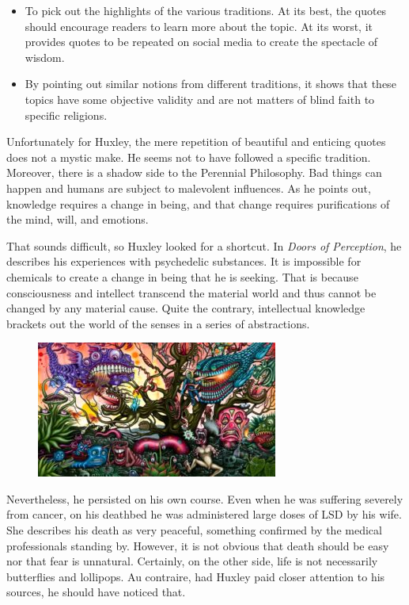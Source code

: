 \begin{itemize}
\item To pick out the highlights of the various traditions. At its best, the quotes should encourage readers to learn more about the topic. At its worst, it provides quotes to be repeated on social media to create the spectacle of wisdom. 
\item By pointing out similar notions from different traditions, it shows that these topics have some objective validity and are not matters of blind faith to specific religions. 
\end{itemize}
Unfortunately for Huxley, the mere repetition of beautiful and enticing quotes does not a mystic make. He seems not to have followed a specific tradition. Moreover, there is a shadow side to the Perennial Philosophy. Bad things can happen and humans are subject to malevolent influences. As he points out, knowledge requires a change in being, and that change requires purifications of the mind, will, and emotions.

That sounds difficult, so Huxley looked for a shortcut. In \emph{Doors of Perception}, he describes his experiences with psychedelic substances. It is impossible for chemicals to create a change in being that he is seeking. That is because consciousness and intellect transcend the material world and thus cannot be changed by any material cause. Quite the contrary, intellectual knowledge brackets out the world of the senses in a series of abstractions.

\begin{figure}
 \includegraphics[scale=.5]{a20210923JourneytotheCenteroftheMind-img001.jpg} 
\end{figure}

Nevertheless, he persisted on his own course. Even when he was suffering severely from cancer, on his deathbed he was administered large doses of LSD by his wife. She describes his death as very peaceful, something confirmed by the medical professionals standing by. However, it is not obvious that death should be easy nor that fear is unnatural. Certainly, on the other side, life is not necessarily butterflies and lollipops. Au contraire, had Huxley paid closer attention to his sources, he should have noticed that.


